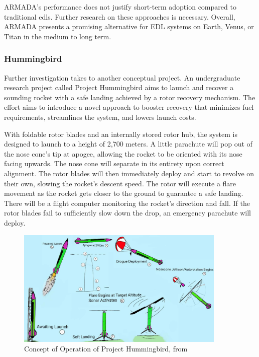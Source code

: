 ARMADA's performance does not justify short-term adoption compared to traditional \gls{edls}. Further research on these approaches is necessary. Overall, ARMADA presents a promising alternative for EDL systems on Earth, Venus, or Titan in the medium to long term.



\subsubsection{Hummingbird}

Further investigation takes to another conceptual project. An undergraduate research project called Project Hummingbird \cite{maurer_project_nodate} aims to launch and recover a sounding rocket with a safe landing achieved by a rotor recovery mechanism. The effort aims to introduce a novel approach to booster recovery that minimizes fuel requirements, streamlines the system, and lowers launch costs.

With foldable rotor blades and an internally stored rotor hub, the system is designed to launch to a height of 2,700 meters. A little parachute will pop out of the nose cone's tip at apogee, allowing the rocket to be oriented with its nose facing upwards. The nose cone will separate in its entirety upon correct alignment. The rotor blades will then immediately deploy and start to revolve on their own, slowing the rocket's descent speed. The rotor will execute a flare movement as the rocket gets closer to the ground to guarantee a safe landing. There will be a flight computer monitoring the rocket's direction and fall. If the rotor blades fail to sufficiently slow down the drop, an emergency parachute will deploy.

\begin{figure}[!htb]
    \centering
    \includegraphics[width=10cm]{Figures/introduction/Hummingbird_operation.png}
    \caption{Concept of Operation of Project Hummingbird, from \cite{maurer_project_nodate}}
    \label{fig:Hummingbird_operation}
\end{figure}

